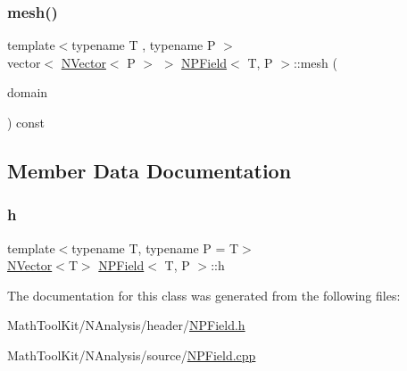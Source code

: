 \subsubsection{\texorpdfstring{mesh()}{mesh()}}
{\footnotesize\ttfamily template$<$typename T , typename P $>$ \\
vector$<$ \mbox{\hyperlink{class_n_vector}{N\+Vector}}$<$ P $>$ $>$ \mbox{\hyperlink{class_n_p_field}{N\+P\+Field}}$<$ T, P $>$\+::mesh (\begin{DoxyParamCaption}\item[{const \mbox{\hyperlink{class_n_compact}{N\+Compact}} \&}]{domain }\end{DoxyParamCaption}) const\hspace{0.3cm}{\ttfamily [protected]}}



\subsection{Member Data Documentation}
\mbox{\label{class_n_p_field_a21a56864db47d8589ec917764e3b2b85}} 
\subsubsection{\texorpdfstring{h}{h}}
{\footnotesize\ttfamily template$<$typename T, typename P = T$>$ \\
\mbox{\hyperlink{class_n_vector}{N\+Vector}}$<$T$>$ \mbox{\hyperlink{class_n_p_field}{N\+P\+Field}}$<$ T, P $>$\+::h}



The documentation for this class was generated from the following files\+:\begin{DoxyCompactItemize}
\item 
Math\+Tool\+Kit/\+N\+Analysis/header/\mbox{\hyperlink{_n_p_field_8h}{N\+P\+Field.\+h}}\item 
Math\+Tool\+Kit/\+N\+Analysis/source/\mbox{\hyperlink{_n_p_field_8cpp}{N\+P\+Field.\+cpp}}\end{DoxyCompactItemize}
